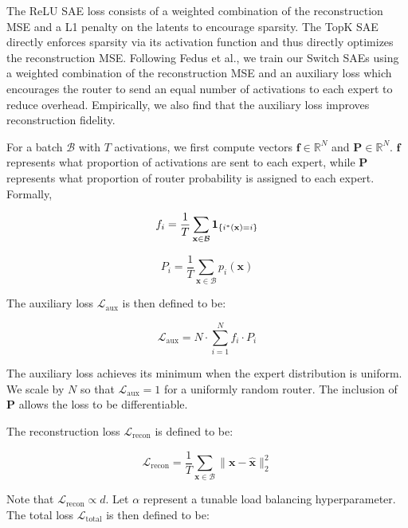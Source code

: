 \documentclass{article} %
\begin{document}
The ReLU SAE loss consists of a weighted combination of the reconstruction MSE and a L1 penalty on the latents to encourage sparsity. The TopK SAE directly enforces sparsity via its activation function and thus directly optimizes the reconstruction MSE. Following Fedus et al., we train our Switch SAEs using a weighted combination of the reconstruction MSE and an auxiliary loss which encourages the router to send an equal number of activations to each expert to reduce overhead. Empirically, we also find that the auxiliary loss improves reconstruction fidelity.

For a batch $\mathcal{B}$ with $T$ activations, we first compute vectors $\mathbf{f} \in \mathbb{R}^N$ and $\mathbf{P} \in \mathbb{R}^N$. $\mathbf{f}$ represents what proportion of activations are sent to each expert, while $\mathbf{P}$ represents what proportion of router probability is assigned to each expert. Formally,

\begin{equation}
f_i = \frac{1}{T} \sum_{\mathbf{x} \in \mathcal{B}} \bm{1}_{\{i^*(\mathbf{x}) = i\}} 
\end{equation}

\begin{equation}
P_i = \frac{1}{T} \sum_{\mathbf{x} \in \mathcal{B}} p_i(\mathbf{x})
\end{equation}

The auxiliary loss $\mathcal{L}_{\text{aux}}$ is then defined to be:

\begin{equation}
\mathcal{L}_{\text{aux}} = N \cdot \sum_{i=1}^N f_i \cdot P_i
\end{equation}

The auxiliary loss achieves its minimum when the expert distribution is uniform. We scale by $N$ so that $\mathcal{L}_{\text{aux}} = 1$ for a uniformly random router. The inclusion of $\mathbf{P}$ allows the loss to be differentiable.

The reconstruction loss $\mathcal{L}_{\text{recon}}$ is defined to be:

\begin{equation}
\mathcal{L}_{\text{recon}} = \frac{1}{T} \sum_{\mathbf{x} \in \mathcal{B}} \|\mathbf{x} - \hat{\mathbf{x}}\|_2^2
\end{equation}

Note that $\mathcal{L}_{\text{recon}} \propto d$. Let $\alpha$ represent a tunable load balancing hyperparameter. The total loss $\mathcal{L}_{\text{total}}$ is then defined to be:
\end{document}
